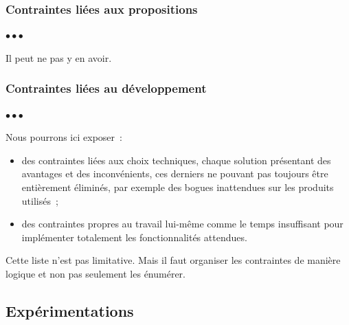 \documentclass[11pt, french, screen, research-development]{report-rd-info}
\newenvironment{explanation}
{\color{blue}
 \begin{list}{}{\hspace{0.2\textwidth}\color{blue}}\item $\bullet\bullet\bullet$
}
{\end{list}}
\begin{document}
\subsubsection{Contraintes liées aux propositions}

\begin{explanation}
   Il peut ne pas y en avoir.
\end{explanation}

\subsubsection{Contraintes liées au développement}

\begin{explanation}
   Nous pourrons ici exposer~:
   \begin{itemize}
      \item des contraintes liées aux choix techniques, chaque solution présentant des avantages et des inconvénients, ces derniers ne pouvant pas toujours être entièrement éliminés, par exemple des bogues inattendues sur les produits utilisés~;
      \item des contraintes propres au travail lui-même comme le temps insuffisant pour implémenter totalement les fonctionnalités attendues.
   \end{itemize}

   Cette liste n'est pas limitative.
   Mais il faut organiser les contraintes de manière logique et non pas seulement les énumérer.
\end{explanation}

\subsection{Expérimentations}
\end{document}
